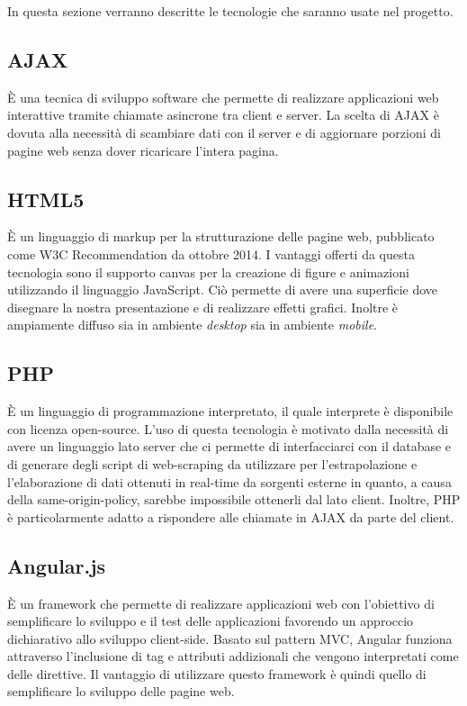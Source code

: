 In questa sezione verranno descritte le tecnologie che saranno usate nel progetto.

\subsection{AJAX}
È una tecnica di sviluppo software che permette di realizzare applicazioni web interattive tramite chiamate asincrone tra client e server.
La scelta di \gls{AJAX} è dovuta alla necessità di scambiare dati con il server e di aggiornare porzioni di pagine web senza dover ricaricare l'intera pagina.

\subsection{HTML5}
È un \gls{linguaggio di markup} per la strutturazione delle pagine web, pubblicato come \gls{W3C} Recommendation da ottobre 2014.
I vantaggi offerti da questa tecnologia sono il supporto canvas per la creazione di figure e animazioni utilizzando il linguaggio \gls{JavaScript}. Ciò permette di avere una superficie dove disegnare la nostra presentazione e di realizzare effetti grafici. Inoltre è ampiamente diffuso sia in ambiente \textit{desktop} sia in ambiente \textit{mobile}.

\subsection{PHP}
È un \gls{linguaggio di programmazione} interpretato, il quale interprete è disponibile con licenza open-source.
L'uso di questa tecnologia è motivato dalla necessità di avere un linguaggio lato server che ci permette di interfacciarci con il \gls{database} e di generare degli script di \gls{web-scraping} da utilizzare per l'estrapolazione e l'elaborazione di dati ottenuti in real-time da sorgenti esterne in quanto, a causa della same-origin-policy, sarebbe impossibile ottenerli dal lato client. Inoltre, \gls{PHP} è particolarmente adatto a rispondere alle chiamate in \gls{AJAX} da parte del client.

\subsection{Angular.js}
È un \gls{framework} che permette di realizzare applicazioni web con l'obiettivo di semplificare lo sviluppo e il test delle applicazioni favorendo un approccio dichiarativo allo sviluppo client-side. Basato sul pattern \gls{MVC}, \gls{Angular} funziona attraverso l'inclusione di tag e attributi addizionali che vengono interpretati come delle direttive.
Il vantaggio di utilizzare questo \gls{framework} è quindi quello di semplificare lo sviluppo delle pagine web.

